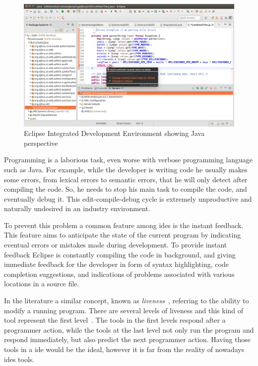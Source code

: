 \begin{figure}[!htbp]
  \centering
  \includegraphics[width=1.0\textwidth]{images/eclipse-2}
    \caption{Eclipse Integrated Development Environment showing Java perspective}
  \label{fig:eclipse}
\end{figure} 

Programming is a laborious task, even worse with verbose programming language such as Java. For example, while the developer is writing code he usually makes some errors, from lexical errors to semantic errors, that he will only detect after compiling the code. So, he needs to stop his main task to compile the code, and eventually debug it. This edit-compile-debug cycle is extremely unproductive and naturally undesired in an industry environment. 

To prevent this problem a common feature among \glspl{ide} is the instant feedback. This feature aims to anticipate the state of the current program by indicating eventual errors or mistakes made during development. To provide instant feedback Eclipse is constantly compiling the code in background, and giving immediate feedback for the developer in form of syntax highlighting, code completion suggestions, and indications of problems associated with various locations in a source file. 

In the literature a similar concept, known as \textit{liveness}~\citep{alpern1985defining}, referring to the ability to modify a running program. There are several levels of liveness and this kind of tool represent the first level~\citep{tanimoto2013perspective}. The tools in the first levels respond after a programmer action, while the tools at the last level not only run the program and respond immediately, but also predict the next programmer action. Having those tools in a \gls{ide} would be the ideal, however it is far from the reality of nowadays \glspl{ide} tools. 


